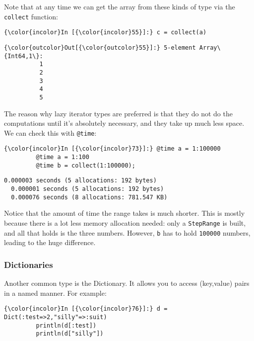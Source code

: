 \documentclass[11pt]{article}
\begin{document}
Note that at any time we can get the array from these kinds of type via
the \texttt{collect} function:

    \begin{Verbatim}[commandchars=\\\{\}]
{\color{incolor}In [{\color{incolor}55}]:} c = collect(a)
\end{Verbatim}

            \begin{Verbatim}[commandchars=\\\{\}]
{\color{outcolor}Out[{\color{outcolor}55}]:} 5-element Array\{Int64,1\}:
          1
          2
          3
          4
          5
\end{Verbatim}
        
    The reason why lazy iterator types are preferred is that they do not do
the computations until it's absolutely necessary, and they take up much
less space. We can check this with \texttt{@time}:

    \begin{Verbatim}[commandchars=\\\{\}]
{\color{incolor}In [{\color{incolor}73}]:} @time a = 1:100000
         @time a = 1:100
         @time b = collect(1:100000);
\end{Verbatim}

    \begin{Verbatim}[commandchars=\\\{\}]
  0.000003 seconds (5 allocations: 192 bytes)
  0.000001 seconds (5 allocations: 192 bytes)
  0.000076 seconds (8 allocations: 781.547 KB)

    \end{Verbatim}

    Notice that the amount of time the range takes is much shorter. This is
mostly because there is a lot less memory allocation needed: only a
\texttt{StepRange} is built, and all that holds is the three numbers.
However, \texttt{b} has to hold \texttt{100000} numbers, leading to the
huge difference.

\subsubsection{Dictionaries}\label{dictionaries}

Another common type is the Dictionary. It allows you to access
(key,value) pairs in a named manner. For example:

    \begin{Verbatim}[commandchars=\\\{\}]
{\color{incolor}In [{\color{incolor}76}]:} d = Dict(:test=>2,"silly"=>:suit)
         println(d[:test])
         println(d["silly"])
\end{Verbatim}
\end{document}
